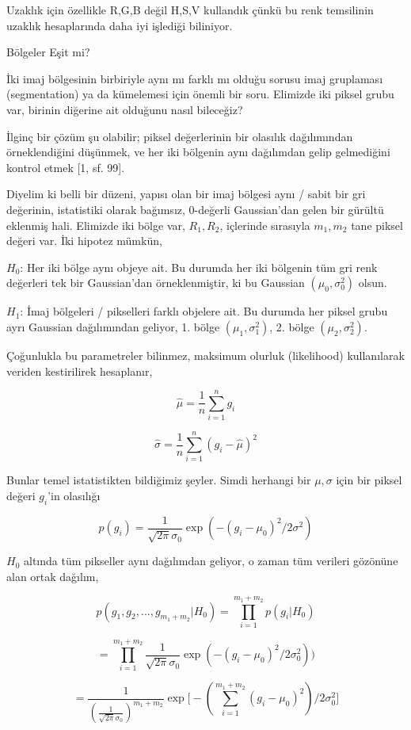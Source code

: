 \documentclass[12pt,fleqn]{article}\usepackage{../../common}
\begin{document}
Uzaklık için özellikle R,G,B değil H,S,V kullandık çünkü bu renk temsilinin
uzaklık hesaplarında daha iyi işlediği biliniyor. 

Bölgeler Eşit mi?

İki imaj bölgesinin birbiriyle aynı mı farklı mı olduğu sorusu imaj gruplaması
(segmentation) ya da kümelemesi için önemli bir soru. Elimizde iki piksel grubu
var, birinin diğerine ait olduğunu nasıl bileceğiz?

İlginç bir çözüm şu olabilir; piksel değerlerinin bir olasılık dağılımından
örneklendiğini düşünmek, ve her iki bölgenin aynı dağılımdan gelip gelmediğini
kontrol etmek [1, sf. 99].

Diyelim ki belli bir düzeni, yapısı olan bir imaj bölgesi aynı / sabit bir gri
değerinin, istatistiki olarak bağımsız, 0-değerli Gaussian'dan gelen bir gürültü
eklenmiş hali. Elimizde iki bölge var, $R_1,R_2$, içlerinde sırasıyla $m_1,m_2$
tane piksel değeri var. İki hipotez mümkün,

$H_0$: Her iki bölge aynı objeye ait. Bu durumda her iki bölgenin tüm gri renk
değerleri tek bir Gaussian'dan örneklenmiştir, ki bu Gaussian $(\mu_0,\sigma_0^2)$
olsun.

$H_1$: İmaj bölgeleri / pikselleri farklı objelere ait. Bu durumda her piksel
grubu ayrı Gaussian dağılımından geliyor, 1. bölge $(\mu_1,\sigma_1^2)$,
2. bölge $(\mu_2,\sigma_2^2)$.

Çoğunlukla bu parametreler bilinmez, maksimum olurluk (likelihood) kullanılarak
veriden kestirilirek hesaplanır,

$$ \hat{\mu} = \frac{1}{n} \sum_{i=1}^{n}g_i $$

$$ \hat{\sigma} = \frac{1}{n} \sum_{i=1}^{n} (g_i-\hat{\mu})^2 $$

Bunlar temel istatistikten bildiğimiz şeyler.  Simdi herhangi bir $\mu,\sigma$
için bir piksel değeri $g_i$'in olasılığı

$$ p(g_i) = \frac{1}{\sqrt{2\pi} \sigma_0} \exp (- (g_i-\mu_0)^2 / 2\sigma^2)  $$

$H_0$ altında tüm pikseller aynı dağılımdan geliyor, o zaman tüm verileri
gözönüne alan ortak dağılım,

$$ p(g_1,g_2,...,g_{m_1+m_2} | H_0) = \prod_{i=1}^{m_1+m_2} p(g_i|H_0)$$

$$
= \prod_{i=1}^{m_1+m_2} \frac{1}{\sqrt{2\pi} \sigma_0}
\exp (- (g_i-\mu_0)^2 / 2\sigma_0^2) )
$$

$$
= \frac{1}{ (\frac{1}{\sqrt{2\pi} \sigma_0})^{m_1+m_2} }
\exp \big[ - (\sum_{i=1}^{m_1 + m_2} (g_i-\mu_0)^2) / 2\sigma_0^2 \big]
$$
\end{document}
